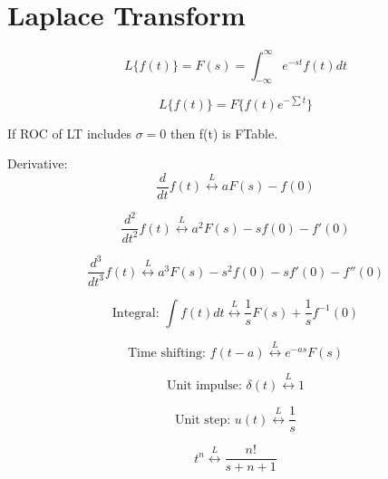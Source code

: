 \documentclass[a4paper]{article}
\begin{document}
\section{Laplace Transform}

\begin{displaymath}
L\{f(t)\}=F(s)=
\int_{-\infty}^{\infty} e^{-st}f(t)dt
\end{displaymath}

\begin{displaymath}
L\{f(t)\}=F\{f(t)e^{-\sum t}\}
\end{displaymath}

If ROC of LT includes $\sigma=0$ then f(t) is FTable.

Derivative:
\begin{displaymath}
\frac{d}{dt}f(t) 
\stackrel{L}{\longleftrightarrow}
aF(s)-f(0)
\end{displaymath}

\begin{displaymath}
\frac{d^2}{dt^2}f(t) 
\stackrel{L}{\longleftrightarrow}
a^2F(s)-sf(0)-f'(0)
\end{displaymath}

\begin{displaymath}
\frac{d^3}{dt^3}f(t) 
\stackrel{L}{\longleftrightarrow}
a^3F(s)-s^2f(0)-sf'(0)-f''(0)
\end{displaymath}


\begin{displaymath}
\textrm{Integral: }
\int f(t)dt
\stackrel{L}{\longleftrightarrow}
\frac{1}{s}F(s) + \frac{1}{s}f^{-1}(0)
\end{displaymath}

\begin{displaymath}
\textrm{Time shifting: }
f(t-a)
\stackrel{L}{\longleftrightarrow}
e^{-as}F(s)
\end{displaymath}


\begin{displaymath}
\textrm{Unit impulse: }
\delta(t)
\stackrel{L}{\longleftrightarrow}
1
\end{displaymath}

\begin{displaymath}
\textrm{Unit step: }
u(t)
\stackrel{L}{\longleftrightarrow}
\frac{1}{s}
\end{displaymath}

\begin{displaymath}
t^n
\stackrel{L}{\longleftrightarrow}
\frac{n!}{s+{n+1}}
\end{displaymath}
\end{document}
